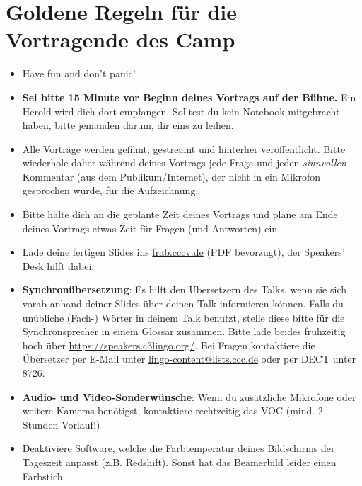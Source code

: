\documentclass[paper=a4]{scrartcl}
\begin{document}
\section*{Goldene Regeln für die Vortragende des Camp}
\begin{itemize}
	\item Have fun and don't panic!
	\item \textbf{Sei bitte 15 Minute vor Beginn deines Vortrags auf der Bühne.} Ein Herold wird dich dort empfangen. Solltest du kein Notebook mitgebracht haben, bitte jemanden darum, dir eins zu leihen.
	\item Alle Vorträge werden gefilmt, gestreamt und hinterher veröffentlicht. Bitte wiederhole daher während deines Vortrags jede Frage und jeden \textit{sinnvollen} Kommentar (aus dem Publikum/Internet), der nicht in ein Mikrofon gesprochen wurde, für die Aufzeichnung.
	\item Bitte halte dich an die geplante Zeit deines Vortrags und plane am Ende deines Vortrags etwas Zeit für Fragen (und Antworten) ein.
	\item Lade deine fertigen Slides ins \url{frab.cccv.de} (PDF bevorzugt), der Speakers' Desk hilft dabei. %
	\item \textbf{Synchronübersetzung}: Es hilft den Übersetzern des Talks, wenn sie sich vorab anhand deiner Slides über deinen Talk informieren können. Falls du unübliche (Fach-\nobreak) Wörter in deinem Talk benutzt, stelle diese bitte für die Synchronsprecher in einem Glossar zusammen. Bitte lade beides frühzeitig hoch über \url{https://speakers.c3lingo.org/}. Bei Fragen kontaktiere die Übersetzer per E-Mail unter \url{lingo-content@lists.ccc.de} oder per DECT unter 8726.
	\item \textbf{Audio- und Video-Sonderwünsche}: Wenn du zusätzliche Mikrofone oder weitere Kameras benötigst, kontaktiere rechtzeitig das VOC (mind. 2 Stunden Vorlauf!)
	\item Deaktiviere Software, welche die Farbtemperatur deines Bildschirms der Tageszeit anpasst (z.B. Redshift). Sonst hat das Beamerbild leider einen Farbstich.
\end{itemize}
\end{document}
